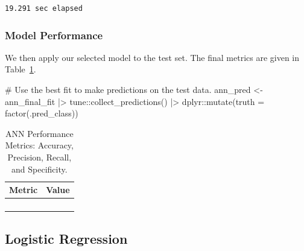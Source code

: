 \documentclass[
  letterpaper,
  DIV=11,
  numbers=noendperiod]{scrartcl}
\newenvironment{Shaded}{\begin{snugshade}}{\end{snugshade}}
\newcommand{\AttributeTok}[1]{\textcolor[rgb]{0.40,0.45,0.13}{#1}}
\newcommand{\CommentTok}[1]{\textcolor[rgb]{0.37,0.37,0.37}{#1}}
\newcommand{\FunctionTok}[1]{\textcolor[rgb]{0.28,0.35,0.67}{#1}}
\newcommand{\NormalTok}[1]{\textcolor[rgb]{0.00,0.23,0.31}{#1}}
\newcommand{\OtherTok}[1]{\textcolor[rgb]{0.00,0.23,0.31}{#1}}
\newcommand{\SpecialCharTok}[1]{\textcolor[rgb]{0.37,0.37,0.37}{#1}}
\begin{document}
\begin{verbatim}
19.291 sec elapsed
\end{verbatim}

\subsubsection{Model Performance}\label{model-performance-2}

We then apply our selected model to the test set. The final metrics are
given in Table~\ref{tbl-ann-performance-pdf}.

\begin{Shaded}
\begin{Highlighting}[]
\CommentTok{\# Use the best fit to make predictions on the test data.}
\NormalTok{ann\_pred }\OtherTok{\textless{}{-}} 
\NormalTok{  ann\_final\_fit }\SpecialCharTok{|\textgreater{}} 
\NormalTok{  tune}\SpecialCharTok{::}\FunctionTok{collect\_predictions}\NormalTok{() }\SpecialCharTok{|\textgreater{}}
\NormalTok{  dplyr}\SpecialCharTok{::}\FunctionTok{mutate}\NormalTok{(}\AttributeTok{truth =} \FunctionTok{factor}\NormalTok{(.pred\_class))}
\end{Highlighting}
\end{Shaded}

\begin{longtable}{>{\raggedright\arraybackslash}p{}>{\raggedleft\arraybackslash}p{}}

\caption{\label{tbl-ann-performance-pdf}ANN Performance Metrics:
Accuracy, Precision, Recall, and Specificity.}

\tabularnewline

\toprule
Metric & Value \\ 
\midrule\addlinespace[2.5pt]
\cellcolor[HTML]{FFFFFF}{Accuracy} & \cellcolor[HTML]{FFFFFF}{92.3} \\ 
\cellcolor[HTML]{FFFFFF}{Precision} & \cellcolor[HTML]{FFFFFF}{84.6} \\ 
\cellcolor[HTML]{FFFFFF}{Recall} & \cellcolor[HTML]{FFFFFF}{88.0} \\ 
\cellcolor[HTML]{FFFFFF}{Specificity} & \cellcolor[HTML]{FFFFFF}{93.9} \\ 
\bottomrule

\end{longtable}

\subsection{Logistic Regression}\label{logistic-regression}
\end{document}
